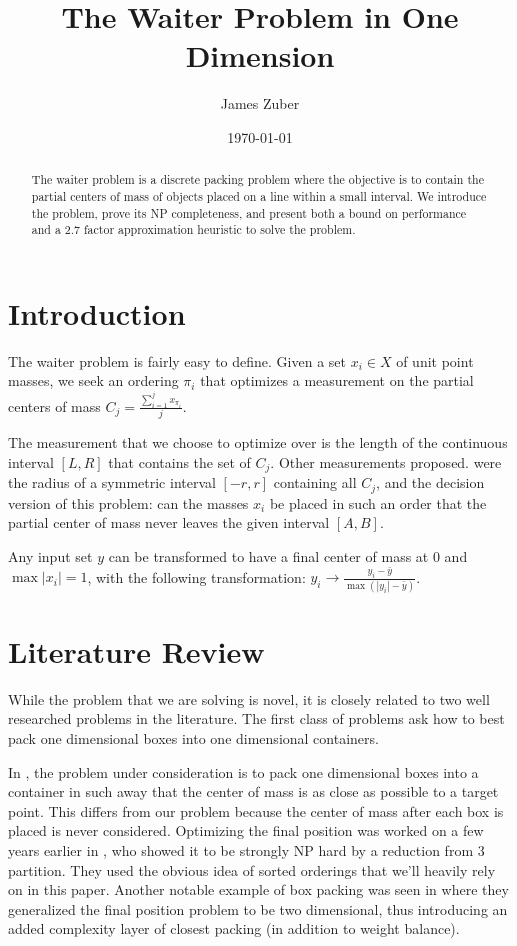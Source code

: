 \documentclass[11pt,twocolumn]{article}
\author{James Zuber}
\title{The Waiter Problem in One Dimension}
\date{\today}
\begin{document}
\maketitle


    \begin{abstract}
The waiter problem is a discrete packing problem where the objective is to contain the partial centers of mass of objects placed on a line within a small interval.  We introduce the problem, prove its NP completeness, and present both a bound on performance and a 2.7 factor approximation heuristic to solve the problem.
    \end{abstract}

\section{Introduction}

The waiter problem is fairly easy to define.  Given a set $x_i \in X$ of unit point masses, we seek an ordering $\pi_i$ that optimizes a measurement on the partial centers of mass $C_j = \frac{\sum_{i=1}^j x_{\pi_i} }{ j }$. 

The measurement that we choose to optimize over is the length of the continuous interval $[L,R]$ that contains the set of $C_j$.  Other measurements proposed.  were the radius of a symmetric interval $[-r,r]$ containing all $C_j$, and the decision version of this problem: can the masses $x_i$ be placed in such an order that the partial center of mass never leaves the given interval $[A,B]$.  

Any input set $y$ can be transformed to have a final center of mass at 0 and  $\max |x_i| = 1$,  with the following transformation: $y_i \rightarrow \frac{y_i - \bar{y} }{\max(|y_i| - \bar{y}) }$.

\section{Literature Review}


While the problem that we are solving is novel, it is closely related to two well researched problems in the literature.  The first class of problems ask how to best pack one dimensional boxes into one dimensional containers.  

In \cite{mathur1998integer}, the problem under consideration is to pack one dimensional boxes into a container in such away that the center of mass is as close as possible to a target point.  This differs from our problem because the center of mass after each box is placed is never considered.  Optimizing the final position was worked on a few years earlier in \cite{amiouny1992balanced}, who showed it to be strongly NP hard by a reduction from 3 partition. They used the obvious idea of sorted orderings that we'll heavily rely on in this paper.  Another notable example of box packing was seen in \cite{davies1999weight} where they generalized the final position problem to be two dimensional, thus introducing an added complexity layer of closest packing (in addition to weight balance).
\end{document}
